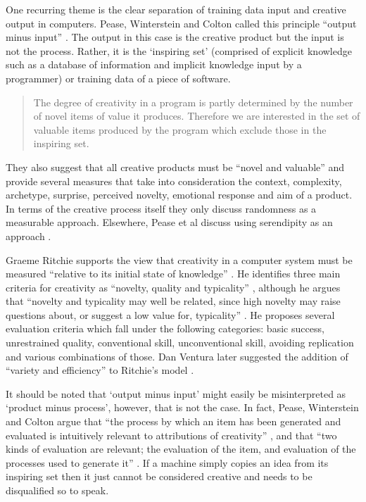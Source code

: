 One recurring theme is the clear separation of training data input and creative output in computers. Pease, Winterstein and Colton called this principle ``output minus input'' \citeyear[p.2]{Pease2001}. The output in this case is the creative product but the input is not the process. Rather, it is the `inspiring set' (comprised of explicit knowledge such as a database of information and implicit knowledge input by a programmer) or training data of a piece of software.

\begin{quotation}
  The degree of creativity in a program is partly determined by the number of novel items of value it produces. Therefore we are interested in the set of valuable items produced by the program which exclude those in the inspiring set. 
\end{quotation}

They also suggest that all creative products must be ``novel and valuable'' \autocite[p.1]{Pease2001} and provide several measures that take into consideration the context, complexity, archetype, surprise, perceived novelty, emotional response and aim of a product. In terms of the creative process itself they only discuss randomness as a measurable approach. Elsewhere, Pease et al discuss using serendipity as an approach \autocite*{Pease2013}.

Graeme Ritchie supports the view that creativity in a computer system must be measured ``relative to its initial state of knowledge'' \citeyear[p.72]{Ritchie2007}. He identifies three main criteria for creativity as ``novelty, quality and typicality'' \citeyear[p.72-73]{Ritchie2007}, although he argues that ``novelty and typicality may well be related, since high novelty may raise questions about, or suggest a low value for, typicality'' \citeyear[p.73]{Ritchie2007} \citeyear[see also][]{Ritchie2001}. He proposes several evaluation criteria which fall under the following categories: \citeyear[p.91-92]{Ritchie2007} basic success, unrestrained quality, conventional skill, unconventional skill, avoiding replication and various combinations of those. Dan Ventura later suggested the addition of ``variety and efficiency'' to Ritchie's model \citeyear[p.7]{Ventura2008}.

It should be noted that `output minus input' might easily be misinterpreted as `product minus process', however, that is not the case. In fact, Pease, Winterstein and Colton argue that ``the process by which an item has been generated and evaluated is intuitively relevant to attributions of creativity'' \citeyear[p.6]{Pease2001}, and that ``two kinds of evaluation are relevant; the evaluation of the item, and evaluation of the processes used to generate it'' \citeyear[p.7]{Pease2001}. If a machine simply copies an idea from its inspiring set then it just cannot be considered creative and needs to be disqualified so to speak.



